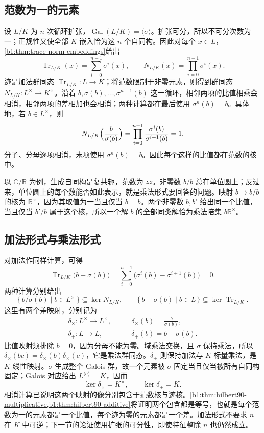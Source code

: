 \subsection{范数为一的元素}
\label{b1:subsec:2001:02}

设 \(L/K\) 为 \(n\) 次循环扩张，\(\operatorname{Gal}(L/K)=\langle\sigma\rangle\)。扩张可分，所以不可分次数为一；正规性又使全部 \(K\) 嵌入恰为这 \(n\) 个自同构。因此对每个 \(x\in L\)，\cref{b1:thm:trace-norm-embeddings}给出
\begin{equation}\label{b1:eq:cyclic-trace-norm}
	\operatorname{Tr}_{L/K}(x)=\sum_{i=0}^{n-1}\sigma^i(x), \qquad N_{L/K}(x)=\prod_{i=0}^{n-1}\sigma^i(x).
\end{equation}
迹是加法群同态 \(\operatorname{Tr}_{L/K}:L\to K\)；将范数限制于非零元素，则得到群同态 \(N_{L/K}:L^\times\to K^\times\)。沿着 \(b,\sigma(b),\ldots,\sigma^{n-1}(b)\) 这一循环，相邻两项的比值相乘会相消，相邻两项的差相加也会相消；两种计算都在最后使用 \(\sigma^n(b)=b\)。具体地，若 \(b\in L^\times\)，则
\[
	N_{L/K}\Bigl(\frac{b}{\sigma(b)}\Bigr) =\prod_{i=0}^{n-1}\frac{\sigma^i(b)}{\sigma^{i+1}(b)}=1.
\]
分子、分母逐项相消，末项使用 \(\sigma^n(b)=b\)。因此每个这样的比值都在范数的核中。

\ProseParagraphBreak
以 \(\mathbb C/\mathbb R\) 为例，生成自同构是复共轭，范数为 \(z\bar z\)。非零数 \(b/\bar b\) 总在单位圆上；反过来，单位圆上的每个数能否如此表示，就是乘法形式要回答的问题。映射 \(b\mapsto b/\bar b\) 的核为 \(\mathbb R^\times\)，因为其取值为一当且仅当 \(b=\bar b\)。两个非零数 \(b,b'\) 给出同一个比值，当且仅当 \(b'/b\) 属于这个核，所以一个解 \(b\) 的全部同类解恰为乘法陪集 \(b\mathbb R^\times\)。

\subsection{加法形式与乘法形式}
\label{b1:subsec:2001:03}

对加法作同样计算，可得
\[
	\operatorname{Tr}_{L/K}\bigl(b-\sigma(b)\bigr) =\sum_{i=0}^{n-1}\bigl(\sigma^i(b)-\sigma^{i+1}(b)\bigr)=0.
\]
两种计算分别给出
\[
	\bigl\{\,b/\sigma(b)\mid b\in L^\times\,\bigr\}\subseteq\ker N_{L/K}, \qquad \{\,b-\sigma(b)\mid b\in L\,\}\subseteq\ker\operatorname{Tr}_{L/K}.
\]
这里有两个差映射，分别记为
\[
	\begin{aligned}
		\delta_\times:L^\times\longrightarrow L^\times, &\qquad \delta_\times(b)=\frac b{\sigma(b)},\\
		\delta_+:L\longrightarrow L, &\qquad \delta_+(b)=b-\sigma(b).
	\end{aligned}
\]
比值映射须排除 \(b=0\)，因为分母不能为零。域乘法交换，且 \(\sigma\) 保持乘法，所以 \(\delta_\times(bc)=\delta_\times(b)\delta_\times(c)\)，它是乘法群同态。\(\delta_+\) 则保持加法与 \(K\) 标量乘法，是 \(K\) 线性映射。\(\sigma\) 生成整个 Galois 群，故一个元素被 \(\sigma\) 固定当且仅当被所有自同构固定；Galois 对应给出 \(L^{\langle\sigma\rangle}=K\)，因而
\[
	\ker\delta_\times=K^\times,\qquad \ker\delta_+=K.
\]
相消计算已说明这两个映射的像分别包含于范数核与迹核。\cref{b1:thm:hilbert90-multiplicative,b1:thm:hilbert90-additive}将证明两个包含都是等号，也就是每个范数为一的元素都是一个比值，每个迹为零的元素都是一个差。加法形式不要求 \(n\) 在 \(K\) 中可逆；下一节的论证使用扩张的可分性，即使特征整除 \(n\) 也仍然成立。
